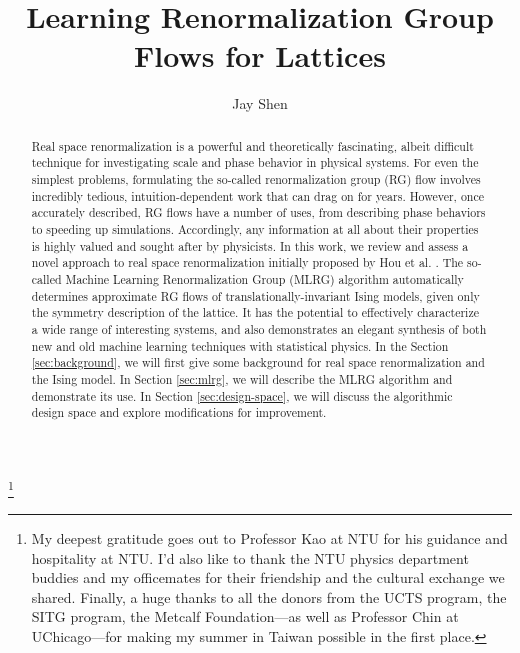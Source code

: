 \documentclass[%
    reprint,
    amsmath,amssymb,
    aps,
]{revtex4-2}
\begin{document}

\title{Learning Renormalization Group Flows for Lattices}

\author{Jay Shen}
\thanks{
    My deepest gratitude goes out to Professor Kao at NTU for his guidance and hospitality at NTU. I'd also like to thank the NTU physics department buddies and my officemates for their friendship and the cultural exchange we shared. Finally, a huge thanks to all the donors from the UCTS program, the SITG program, the Metcalf Foundation—as well as Professor Chin at UChicago—for making my summer in Taiwan possible in the first place. 
}

\begin{abstract}

    Real space renormalization is a powerful and theoretically fascinating, albeit 
    difficult technique for investigating scale and phase behavior in physical systems. For even the simplest problems, formulating the so-called renormalization group (RG) flow involves incredibly tedious, intuition-dependent work that can drag on for years. However, once accurately described, RG flows have a number of uses, from describing phase behaviors to speeding up simulations. Accordingly, any information at all about their properties is highly valued and sought after by physicists. In this work, we review and assess a novel approach to real space renormalization initially proposed by Hou et al. \cite{mlrg}. The so-called Machine Learning Renormalization Group (MLRG) algorithm automatically determines approximate RG flows of translationally-invariant Ising models, given only the symmetry description of the lattice. It has the potential to effectively characterize a wide range of interesting systems, and also demonstrates an elegant synthesis of both new and old machine learning techniques with statistical physics. In the Section \ref{sec:background}, we will first give some background for real space renormalization and the Ising model. In Section \ref{sec:mlrg}, we will describe the MLRG algorithm and demonstrate its use. In Section \ref{sec:design-space}, we will discuss the algorithmic design space and explore modifications for improvement. 

\end{abstract}

\maketitle
\end{document}
